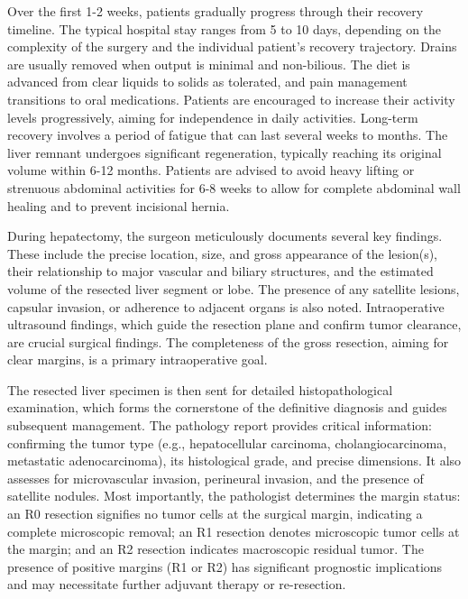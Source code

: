Over the first 1-2 weeks, patients gradually progress through their recovery timeline. The typical hospital stay ranges from 5 to 10 days, depending on the complexity of the surgery and the individual patient's recovery trajectory. Drains are usually removed when output is minimal and non-bilious. The diet is advanced from clear liquids to solids as tolerated, and pain management transitions to oral medications. Patients are encouraged to increase their activity levels progressively, aiming for independence in daily activities. Long-term recovery involves a period of fatigue that can last several weeks to months. The liver remnant undergoes significant regeneration, typically reaching its original volume within 6-12 months. Patients are advised to avoid heavy lifting or strenuous abdominal activities for 6-8 weeks to allow for complete abdominal wall healing and to prevent incisional hernia.

During hepatectomy, the surgeon meticulously documents several key findings. These include the precise location, size, and gross appearance of the lesion(s), their relationship to major vascular and biliary structures, and the estimated volume of the resected liver segment or lobe. The presence of any satellite lesions, capsular invasion, or adherence to adjacent organs is also noted. Intraoperative ultrasound findings, which guide the resection plane and confirm tumor clearance, are crucial surgical findings. The completeness of the gross resection, aiming for clear margins, is a primary intraoperative goal.

The resected liver specimen is then sent for detailed histopathological examination, which forms the cornerstone of the definitive diagnosis and guides subsequent management. The pathology report provides critical information: confirming the tumor type (e.g., hepatocellular carcinoma, cholangiocarcinoma, metastatic adenocarcinoma), its histological grade, and precise dimensions. It also assesses for microvascular invasion, perineural invasion, and the presence of satellite nodules. Most importantly, the pathologist determines the margin status: an R0 resection signifies no tumor cells at the surgical margin, indicating a complete microscopic removal; an R1 resection denotes microscopic tumor cells at the margin; and an R2 resection indicates macroscopic residual tumor. The presence of positive margins (R1 or R2) has significant prognostic implications and may necessitate further adjuvant therapy or re-resection.

